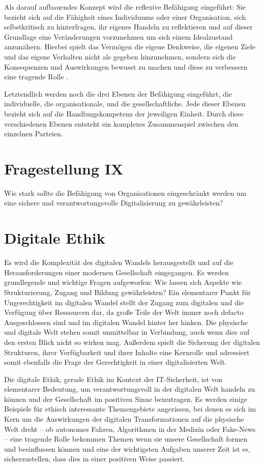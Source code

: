 \documentclass[journal]{IEEEtran}
\begin{document}
\begin{onecolumn}
Als darauf aufbauendes Konzept wird die reflexive Befähigung eingeführt: Sie bezieht sich auf die Fähigkeit eines
Individuums oder einer Organisation, sich selbstkritisch zu hinterfragen, ihr eigenes Handeln zu reflektieren und auf 
dieser Grundlage eine Veränderungen vorzunehmen um sich einem Idealzustand anzunähern. Hierbei spielt das Vermögen die
eigene Denkweise, die eigenen Ziele und das eigene Verhalten nicht als gegeben hinzunehmen, sondern sich die 
Konsequenzen und Auswirkungen bewusst zu machen und diese zu verbessern eine tragende Rolle .

Letztendlich werden noch die drei Ebenen der Befähigung eingeführt, die individuelle, die organisationale, und die 
gesellschaftliche. Jede dieser Ebenen bezieht sich auf die Handlungskompetenz der jeweiligen Einheit. Durch diese
verschiedenen Ebenen entsteht ein komplexes Zusammenspiel zwischen den einzelnen Parteien.

\section*{Fragestellung IX}

Wie stark sollte die Befähigung von Organisationen eingeschränkt werden um eine sichere und verantwortungsvolle 
Digitalisierung zu gewährleisten?

\section{Digitale Ethik}

Es wird die Komplexität des digitalen Wandels herausgestellt und auf die Herausforderungen einer modernen
Gesellschaft eingegangen. Es werden grundlegende und wichtige Fragen aufgeworfen: Wie lassen sich Aspekte
wie Strukturierung, Zugang und Bildung gewährleisten? Ein elementarer Punkt für Ungerechtigkeit im digitalen
Wandel stellt der Zugang zum digitalen und die Verfügung über Ressourcen dar, da große Teile der Welt immer
noch defacto Ausgeschlossen sind und im digitalen Wandel hinter her hinken. Die physische und digitale Welt stehen somit 
unmittelbar in Verbindung, auch wenn dies auf den ersten Blick nicht so wirken mag. Außerdem spielt die Sicherung
der digitalen Strukturen, ihrer Verfügbarkeit und ihrer Inhalte eine Kernrolle und adressiert somit ebenfalls die
Frage der Gerechtigkeit in einer digitalisierten Welt.

Die digitale Ethik, gerade Ethik im Kontext der IT-Sicherheit, ist von elementarer Bedeutung, um  verantwortungsvoll
in der digitalen Welt handeln zu können und der Gesellschaft im positiven Sinne beizutragen. Es werden einige
Beispiele für ethisch interessante Themengebiete angerissen, bei denen es sich im Kern um die Auswirkungen der
digitalen Transformationen auf die physische Welt dreht – ob autonomes Fahren, Algorithmen in der Medizin oder
Fake-News – eine tragende Rolle bekommen Themen wenn sie unsere Gesellschaft formen und beeinflussen können
und eine der wichtigsten Aufgaben unserer Zeit ist es, sicherzustellen, dass dies in einer positiven Weise passiert.


\end{onecolumn}
\end{document}

